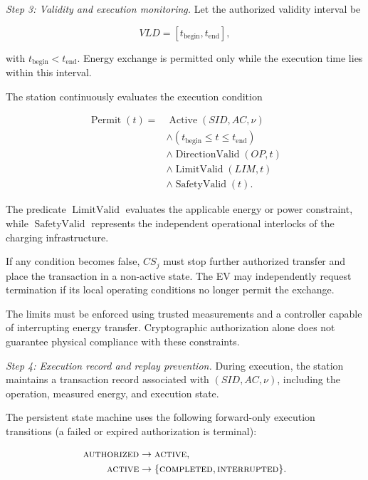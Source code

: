\documentclass[twocolumn,10pt,journal]{IEEEtran}
\begin{document}
\textit{Step 3: Validity and execution monitoring.}
Let the authorized validity interval be

\begin{equation}
VLD=[t_{\mathrm{begin}},t_{\mathrm{end}}],
\label{eq:qsv2g_execution_validity}
\end{equation}

with $t_{\mathrm{begin}}<t_{\mathrm{end}}$.
Energy exchange is permitted only while
the execution time lies within this interval.

The station continuously evaluates the
execution condition

\begin{equation}
\begin{aligned}
\operatorname{Permit}(t)
={}&
\operatorname{Active}(SID,AC,\nu)\\
&\land
(t_{\mathrm{begin}}\leq t\leq t_{\mathrm{end}})\\
&\land
\operatorname{DirectionValid}(OP,t)\\
&\land
\operatorname{LimitValid}(LIM,t)\\
&\land
\operatorname{SafetyValid}(t).
\end{aligned}
\label{eq:qsv2g_execution_permission}
\end{equation}

The predicate $\operatorname{LimitValid}$
evaluates the applicable energy or power
constraint, while
$\operatorname{SafetyValid}$ represents
the independent operational interlocks
of the charging infrastructure.

If any condition becomes false, $CS_j$
must stop further authorized transfer
and place the transaction in a
non-active state. The EV may independently
request termination if its local operating
conditions no longer permit the exchange.

The limits must be enforced using trusted
measurements and a controller capable of
interrupting energy transfer. Cryptographic
authorization alone does not guarantee
physical compliance with these constraints.

\textit{Step 4: Execution record and replay prevention.}
During execution, the station maintains a
transaction record associated with
$(SID,AC,\nu)$, including the operation,
measured energy, and execution state.

The persistent state machine uses the following forward-only
execution transitions (a failed or expired authorization is terminal):

\begin{equation}
\begin{aligned}
\textsc{authorized}
&\rightarrow \textsc{active},\\
\textsc{active}
&\rightarrow
\{\textsc{completed},
  \textsc{interrupted}\}.
\end{aligned}
\label{eq:qsv2g_execution_states}
\end{equation}
\end{document}
